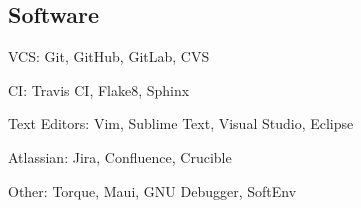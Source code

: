 
\subsection{Software}

VCS: Git, GitHub, GitLab, CVS

CI: Travis CI, Flake8, Sphinx

Text Editors: Vim, Sublime Text, Visual Studio, Eclipse

Atlassian: Jira, Confluence, Crucible

Other: Torque, Maui, GNU Debugger, SoftEnv
